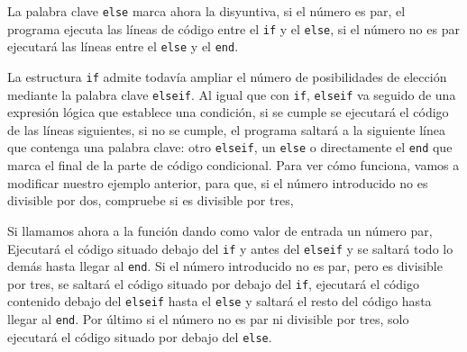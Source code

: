 

La palabra clave \texttt{else} marca ahora la disyuntiva, si el número es par, el programa ejecuta las líneas de código entre el \texttt{if} y el \texttt{else}, si el número no es par ejecutará las líneas entre el \texttt{else} y el \texttt{end}.

La estructura \texttt{if} admite todavía ampliar el número de posibilidades de elección mediante la palabra clave \texttt{elseif}. Al igual que  con \texttt{if}, \texttt{elseif} va seguido de una expresión lógica que establece una condición, si se cumple se ejecutará el código de las líneas siguientes, si no se cumple, el programa saltará a la siguiente línea que contenga una palabra clave: otro \texttt{elseif}, un \texttt{else} o directamente el \texttt{end} que marca el final de la parte de código condicional. Para ver cómo funciona, vamos a modificar nuestro ejemplo anterior, para que, si el número introducido no es divisible por dos, compruebe si es divisible por tres,






Si llamamos ahora a la función dando como valor de entrada un número par, Ejecutará el código situado debajo del \texttt{if} y antes del \texttt{elseif} y se saltará todo lo demás hasta llegar al \texttt{end}. Si el número introducido no es par, pero es divisible por tres, se saltará el código situado por debajo del \texttt{if}, ejecutará el código contenido debajo del \texttt{elseif} hasta el \texttt{else} y saltará el resto del código hasta llegar al \texttt{end}. Por último si el número no es par ni divisible por tres, solo ejecutará el código situado por debajo del \texttt{else}.

